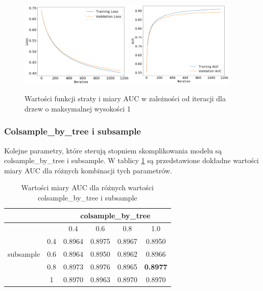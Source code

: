 \documentclass[12pt]{article}
\begin{document}
\begin{figure}[h]
    \centering
\includegraphics[width=0.48\textwidth]{xgboost/depth1_loss.png}
\includegraphics[width=0.45\textwidth]{xgboost/depth1_auc.png}
    \caption{Wartości funkcji straty i miary AUC w zależności od iteracji dla drzew o maksymalnej wysokości 1}
    \label{fig:xgboost_training_depth1}
\end{figure}

\subsubsection{Colsample\_by\_tree i subsample}

Kolejne parametry, które sterują stopniem skomplikowania modelu są colsample\_by\_tree i subsample. W tablicy \ref{tab:xgboost_sample} są przedstawione dokładne wartości miary AUC dla różnych kombinacji tych parametrów.

\begin{table}[h]
    \centering
    \begin{tabular}{|l|c|c|c|c|c|}
        \hline
         & &  \multicolumn{4}{c|}{colsample\_by\_tree}  \\ \hline
        \multirow{6}{*}{subsample} & & 0.4 & 0.6 & 0.8 & 1.0 \\ \cline{2 - 6}
& 0.4 & 0.8964 & 0.8975 & 0.8967 & 0.8950 \\ \cline{2 - 6} 
& 0.6 & 0.8964 & 0.8950 & 0.8962 & 0.8966 \\ \cline{2 - 6} 
& 0.8 & 0.8973 & 0.8976 & 0.8965 & \textbf{0.8977} \\ \cline{2 - 6} 
& 1 & 0.8970 & 0.8963 & 0.8970 & 0.8970 \\ \hline

    \end{tabular}
    \caption{Wartości miary AUC dla różnych wartości colsample\_by\_tree i subsample}
    \label{tab:xgboost_sample}
\end{table}
\end{document}
